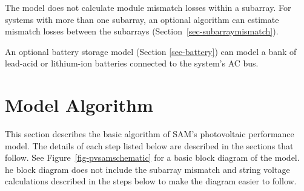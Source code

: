 \documentclass[12pt,letterpaper]{article}
\begin{document}
The model does not calculate module mismatch losses within a subarray. For systems with more than one subarray, an optional algorithm can estimate mismatch losses between the subarrays (Section~\ref{sec-subarraymismatch}).

An optional battery storage model (Section \ref{sec-battery}) can model a bank of lead-acid or lithium-ion batteries connected to the system's AC bus.

\section{Model Algorithm}

This section describes the basic algorithm of SAM's photovoltaic performance model. The details of each step listed below are described in the sections that follow. See Figure~\ref{fig-pvsamschematic} for a basic block diagram of the model. he block diagram does not include the subarray mismatch and string voltage calculations described in the steps below to make the diagram easier to follow.
\end{document}
